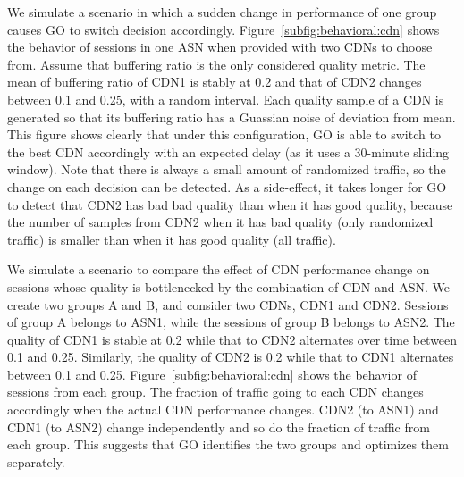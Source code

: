  We simulate a scenario in which a sudden change in performance of one group causes GO to switch decision accordingly. Figure~\ref{subfig:behavioral:cdn} shows the behavior of sessions in one ASN when provided with two CDNs to choose from. Assume that buffering ratio is the only considered quality metric. The mean of buffering ratio of CDN1 is stably at 0.2 and that of CDN2 changes between 0.1 and 0.25, with a random interval. Each quality sample of a CDN is generated so that its buffering ratio has a Guassian noise of \fillme deviation from mean. This figure shows clearly that under this configuration, GO is able to switch to the best CDN accordingly with an expected delay (as it uses a 30-minute sliding window). Note that there is always a small amount of randomized traffic, so the change on each decision can be detected. As a side-effect, it takes longer for GO to detect that CDN2 has bad bad quality than when it has good quality, because the number of samples from CDN2 when it has bad quality (only randomized traffic) is smaller than when it has good quality (all traffic).

 We simulate a scenario to compare the effect of CDN performance change on sessions whose quality is bottlenecked by the combination of CDN and ASN. We create two groups A and B, and consider two CDNs, CDN1 and CDN2. Sessions of group A belongs to ASN1, while the sessions of group B belongs to ASN2. The quality of CDN1 is stable at 0.2 while that to CDN2 alternates over time between 0.1 and 0.25. Similarly, the quality of CDN2 is 0.2 while that to CDN1 alternates between 0.1 and 0.25. Figure~\ref{subfig:behavioral:cdn} shows the behavior of sessions from each group. The fraction of traffic going to each CDN changes accordingly when the actual CDN performance changes. CDN2 (to ASN1) and CDN1 (to ASN2) change independently and so do the fraction of traffic from each group. This suggests that GO identifies the two groups and optimizes them separately.

